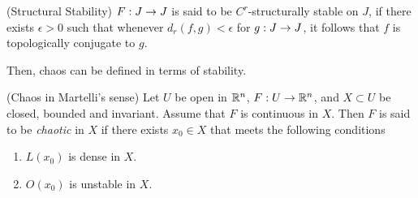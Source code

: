 \documentclass[12pt,draft,twoside]{book}
\begin{document}
\begin{definition}
  (Structural Stability) $F: J \rightarrow J$ is said to be $C^r$-structurally
  stable on $J$, if there exists $\epsilon > 0$ such that whenever
  $d_r(f,g) < \epsilon$ for $g: J\rightarrow J$, it follows that $f$
  is topologically conjugate to $g$.
\end{definition}

Then, chaos can be defined in terms of stability.

\begin{definition}
  (Chaos in Martelli's sense)
  Let $U$ be open in $\mathbb{R}^n$, $F: U \to \mathbb{R}^n$, and $X\subset U$ be closed, bounded and invariant.
  Assume that $F$ is continuous in $X$.
  Then $F$ is said to be \textit{chaotic} in $X$ if there exists $x_0 \in X$ that meets the following conditions
  \begin{enumerate}
    \item $L(x_0)$ is dense in $X$.
    \item $O(x_0)$ is unstable in $X$.
  \end{enumerate}
  \label{defn:chaosmartelli}
\end{definition}
\end{document}
